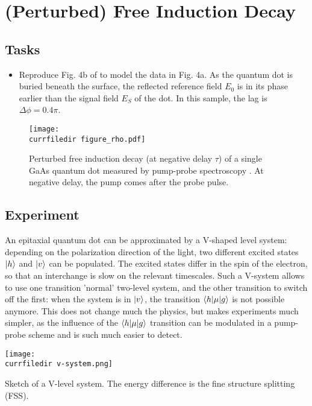 \renewcommand{\lastmod}{May 1, 2020}


\chapter{(Perturbed) Free Induction Decay}



\section{Tasks}

\begin{itemize}
\item Reproduce Fig. 4b of \cite{Wolpert:2012hs} to model the data in Fig. 4a. As the quantum dot is buried beneath the surface, the reflected reference field $E_0$ is in its phase earlier than the signal field $E_S$ of the dot. In this sample, the lag is $\Delta \phi = 0.4 \pi$.
\end{itemize}

\begin{figure}
\centering
\texttt{[image: \\currfiledir figure\_rho.pdf]}
\caption{Perturbed free induction decay (at negative delay $\tau$) of a single GaAs quantum dot measured by pump-probe spectroscopy \citep{Wolpert:2012hs}. At negative delay, the pump comes after the probe pulse.}
\end{figure}

\section{Experiment}

An epitaxial quantum dot can be approximated by a V-shaped level system: depending on the polarization direction of the light, two different excited states $\ket{h}$ and $\ket{v}$
 can be populated. The excited states differ in the spin of the electron, so that an interchange is slow on the relevant timescales. Such a V-system allows to use one transition 'normal' two-level system, and the other transition to switch off the first: when the system is in $\ket{v}$, the transition $\braket{h | \mu | g}$ is not possible anymore. This does not change much the physics, but makes experiments much simpler, as the influence of the  $\braket{h | \mu | g}$ transition can be modulated in a pump-probe scheme and is such much easier to detect.
 
\begin{marginfigure}
\texttt{[image: \\currfiledir v-system.png]}
\caption{Sketch of a V-level system. The energy difference is the fine structure splitting (FSS).}
\end{marginfigure}


